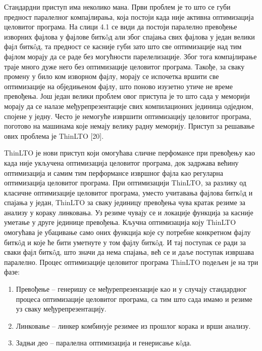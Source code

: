 \documentclass[12pt,oneside]{memoir}
\begin{document}
Стандардни приступ има неколико мана.
Први проблем је то што се губи предност паралелног компајлирања, која постоји 
када није активна оптимизација целовитог програма.
На слици 4.1 се види да постоји паралелно превођење изворних фајлова у 
фајлове битк\^{o}д али због спајања свих фајлова у један велики фајл битк\^{o}д,
та предност се касније губи зато што све оптимизације над тим фајлом морају 
да се раде без могућности парелелизације.
Због тога компајлирање траје много дуже него без оптимизације целовитог програма.
Такође, за сваку промену у било ком изворном фајлу, морају се испочетка
вршити све оптимизације на обједињеном фајлу, што поново изузетно утиче не време
превођења.
Још један велики проблем овог приступа је то што сада у меморији морају да се налазе  међурепрезентације свих компилационих јединица одједном, спојене
у једну. 
Често је немогуће извршити оптимизацију целовитог програма, поготово на 
машинама које немају велику радну меморију.
Приступ за решавање ових проблема је  ThinLTO [20].
\par ThinLTO је нови приступ који омогућава сличне перфомансе при превођењу
као када није укључена оптимизација целовитог програма, док задржава већину
оптимизација и самим тим перформансе извршног фајла као регуларна оптимизација
целовитог програма.
При оптимизацији ThinLTO, за разлику од класичне оптимизације целовитог програма, уместо учитавања фајлова битк\^{o}д и спајања у један,
ThinLTO за сваку јединицу превођења чува кратак
резиме за анализу у кораку линковања. 
Уз резиме чувају се и локације функција за касније уметање у друге јединице 
превођења.
Кључна оптимизација коју ThinLTO омогућава је убацивање само оних функција које
су потребне конкретном фајлу битк\^{o}д и које ће бити уметнуте у том фајлу битк\^{o}д.
И тај поступак се ради за сваки фајл битк\^{o}д, што значи да нема спајања, већ се и
даље поступак  извршава паралелно.
Процес оптимизације целовитог програма ThinLTO подељен је на три фазе:
\begin{enumerate}
\item Превођење -- генеришу се међурепрезензације као и у случају стандардног процеса
	оптимизације целовитог програма, са тим што сада имамо и резиме уз сваку
	међурепрезентацију.
\item Линковање -- линкер комбинује резимее из прошлог корака и врши анализу.
\item Задњи део -- паралелна оптимизација и генерисање к\^{o}да.
\end{enumerate}
 
\end{document}

